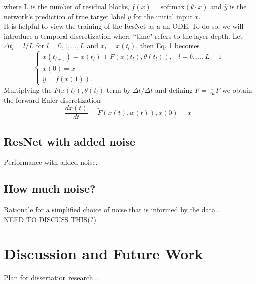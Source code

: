 \documentclass[12pt]{article}
\begin{document}
where L is the number of residual blocks, $f(x) = \text{softmax}(\theta \cdot x)$ and $\hat y$ is the network's prediction of true target label $y$ for the initial input $x$. \\
\indent It is helpful to view the training of the ResNet as a an ODE. To do so, we will introduce a temporal discretization where ``time" refers to the layer depth. Let $\Delta t_l = l/L$ for $l=0,1,\dots,L$ and $x_l = x(t_l)$, then Eq. 1 becomes
\begin{equation} \begin{cases}
x(t_{l+1}) = x(t_l) + F(x(t_l),\theta(t_l)), & l=0,\dots,L-1 \\
x(0) = x \\
\hat y = f(x(1)).
\end{cases} \end{equation}
Multiplying the $F(x(t_l),\theta(t_l)$ term by $\Delta t/\Delta t$ and defining $\tilde{F} = \frac{1}{\Delta t} F$ we obtain the forward Euler discretization
\begin{equation}
  \dfrac{dx(t)}{dt} = \tilde{F}(x(t),w(t)),  x(0) = x.
\end{equation}
\subsection{ResNet with added noise}
Performance with added noise.
\subsection{How much noise?}
Rationale for a simplified choice of noise that is informed by the data...\\
NEED TO DISCUSS THIS(?)
\section{Discussion and Future Work}
Plan for dissertation research...

\end{document}
